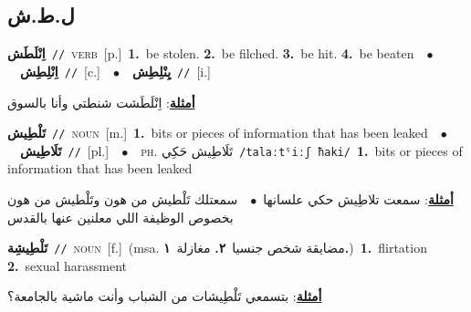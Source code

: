 \documentclass[10pt,a4paper,twoside]{article} %
\begin{document}
\begin{multicols}{2}
\vspace{-3mm}
\subsection*{\color{blue}\foreignlanguage{arabic}{ل.ط.ش}\color{blue}{}} 

{\setlength\topsep{0pt}\textbf{\foreignlanguage{arabic}{اِنْلَطَش}}\ {\color{gray}\texttt{//}\color{black}}\ \textsc{verb}\ [p.]\ \textbf{1.}~be stolen.  \textbf{2.}~be filched.  \textbf{3.}~be hit.  \textbf{4.}~be beaten\ \ $\bullet$\ \ \setlength\topsep{0pt}\textbf{\foreignlanguage{arabic}{اِنْلِطِش}}\ {\color{gray}\texttt{//}\color{black}}\ [c.]\ \ $\bullet$\ \ \setlength\topsep{0pt}\textbf{\foreignlanguage{arabic}{يِنْلِطِش}}\ {\color{gray}\texttt{//}\color{black}}\ [i.]\  \begin{flushright}\color{gray}\foreignlanguage{arabic}{\textbf{\underline{\foreignlanguage{arabic}{أمثلة}}}: اِنْلَطَشت شنطتي وأنا بالسوق}\end{flushright}\color{black}} \vspace{2mm}

{\setlength\topsep{0pt}\textbf{\foreignlanguage{arabic}{تَلْطِيش}}\ {\color{gray}\texttt{//}\color{black}}\ \textsc{noun}\ [m.]\ \textbf{1.}~bits or pieces of information that has been leaked\ \ $\bullet$\ \ \setlength\topsep{0pt}\textbf{\foreignlanguage{arabic}{تَلَاطِيش}}\ {\color{gray}\texttt{//}\color{black}}\ [pl.]\ \ $\bullet$\ \ \textsc{ph.} \color{gray} \foreignlanguage{arabic}{تَلَاطِيش حَكِي}\color{black}\ {\color{gray}\texttt{/{\sffamily talaːtˤiːʃ ħaki}/}\color{black}}\ \textbf{1.}~bits or pieces of information that has been leaked\  \begin{flushright}\color{gray}\foreignlanguage{arabic}{\textbf{\underline{\foreignlanguage{arabic}{أمثلة}}}: سمعت تلاطِيش حكي علسانها\ $\bullet$\ \  سمعتلك تَلْطيش من هون وتَلْطيش من هون بخصوص الوظيفة اللي معلنين عنها بالقدس}\end{flushright}\color{black}} \vspace{2mm}

{\setlength\topsep{0pt}\textbf{\foreignlanguage{arabic}{تَلْطِيشِة}}\ {\color{gray}\texttt{//}\color{black}}\ \textsc{noun}\ [f.]\ \color{gray}(msa. \foreignlanguage{arabic}{مضايقة شخص جنسيا}~\foreignlanguage{arabic}{\textbf{٢.}}  \foreignlanguage{arabic}{مغازلة}~\foreignlanguage{arabic}{\textbf{١.}})\color{black}\ \textbf{1.}~flirtation  \textbf{2.}~sexual harassment\  \begin{flushright}\color{gray}\foreignlanguage{arabic}{\textbf{\underline{\foreignlanguage{arabic}{أمثلة}}}: بتسمعي تَلْطِيشات من الشباب وأنت ماشية بالجامعة؟}\end{flushright}\color{black}} \vspace{2mm}


\end{multicols}
\end{document}
